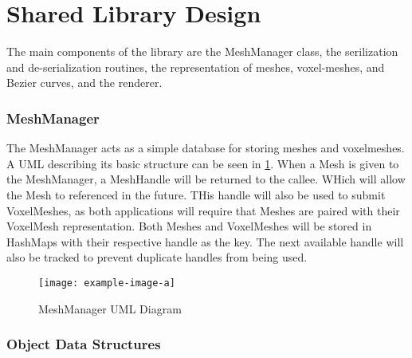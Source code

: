 \section{Shared Library Design}\label{SharedLibrary}


The main components of the library are the MeshManager class, the serilization and 
de-serialization routines, the representation of meshes, voxel-meshes, and Bezier curves, and the
renderer.


\subsubsection{MeshManager}
The MeshManager acts as a simple database for storing meshes and voxelmeshes. A UML describing its
basic structure can be seen in \ref{fig:MeshManagerUML}. When a Mesh is given to the MeshManager, a
MeshHandle will be returned to the callee. WHich will allow the Mesh to referenced in the future.
THis handle will also be used to submit VoxelMeshes, as both applications will require that Meshes 
are paired with their VoxelMesh representation. Both Meshes and VoxelMeshes will be stored in 
HashMaps with their respective handle as the key. The next available handle will also be tracked
to prevent duplicate handles from being used.

\begin{figure}[h]
  \centering
  \texttt{[image: example-image-a]}
  \caption{MeshManager UML Diagram}
  \label{fig:MeshManagerUML}
\end{figure}

\subsubsection{Object Data Structures}

